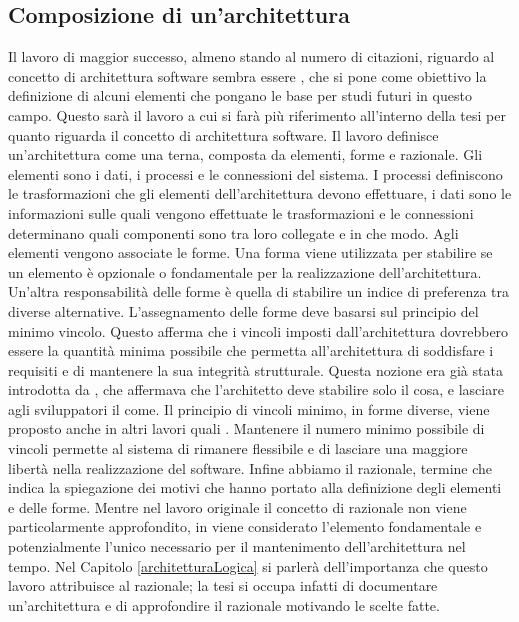 \documentclass[a4paper,12pt]{report}
\begin{document}
\subsection{Composizione di un'architettura}
Il lavoro di maggior successo, almeno stando al numero di citazioni, riguardo al concetto di architettura software sembra essere \cite{perry_foundations_1992}, che si pone come obiettivo la definizione di alcuni elementi che pongano le base per studi futuri in questo campo.
Questo sarà il lavoro a cui si farà più riferimento all'interno della tesi per quanto riguarda il concetto di architettura software.
Il lavoro definisce un'architettura come una terna, composta da elementi, forme e razionale.
Gli elementi sono i dati, i processi e le connessioni del sistema.
I processi definiscono le trasformazioni che gli elementi dell'architettura devono effettuare, i dati sono le informazioni sulle quali vengono effettuate le trasformazioni e le connessioni determinano quali componenti sono tra loro collegate e in che modo.
Agli elementi vengono associate le forme. 
Una forma viene utilizzata per stabilire se un elemento è opzionale o fondamentale per la realizzazione dell'architettura.
Un'altra responsabilità delle forme è quella di stabilire un indice di preferenza tra diverse alternative.
L'assegnamento delle forme deve basarsi sul principio del minimo vincolo.
Questo afferma che i vincoli imposti dall'architettura dovrebbero essere la quantità minima possibile che permetta all'architettura di soddisfare i requisiti e di mantenere la sua integrità strutturale. 
Questa nozione era già stata introdotta da \cite{brooks_jr_mythical_1974}, che affermava che l'architetto deve stabilire solo il cosa, e lasciare agli sviluppatori il come.
Il principio di vincoli minimo, in forme diverse, viene proposto anche in altri lavori quali \cite{thomas1999pragmatic,whoneedsanArchitect}.
Mantenere il numero minimo possibile di vincoli permette al sistema di rimanere flessibile e di lasciare una maggiore libertà nella realizzazione del software.
Infine abbiamo il razionale, termine che indica la spiegazione dei motivi che hanno portato alla definizione degli elementi e delle forme.
Mentre nel lavoro originale il concetto di razionale non viene particolarmente approfondito, in \cite{designChoiche} viene considerato l'elemento fondamentale e potenzialmente l'unico necessario per il mantenimento dell'architettura nel tempo.
Nel Capitolo \ref{architetturaLogica} si parlerà dell'importanza che questo lavoro attribuisce al razionale; la tesi si occupa infatti di documentare un'architettura e di approfondire il razionale motivando le scelte fatte.
\end{document}
